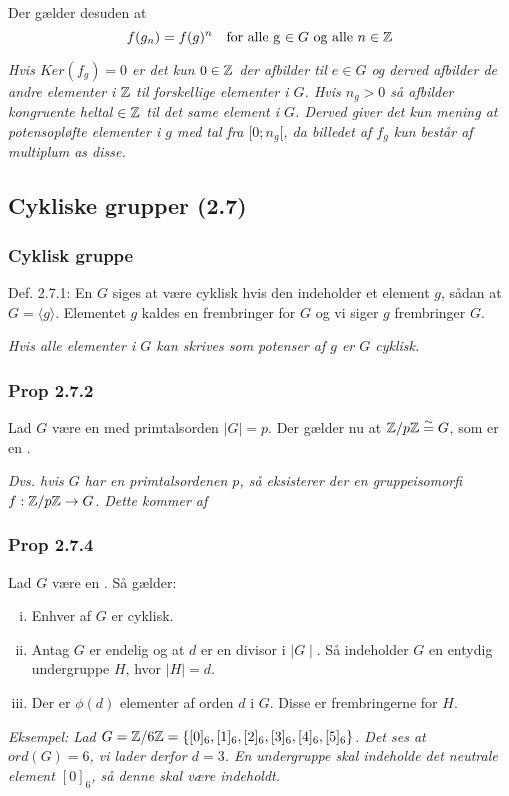 Der gælder desuden at
\begin{equation*}
  f(g_n) = f(g)^n \quad \text{for alle g $\in G$ og alle $n \in \mathbb{Z}$}
\end{equation*}

\textit{Hvis $Ker (f_g) = {0}$ er det kun $0 \in \mathbb{Z}$ der afbilder til $e
\in G$ og derved afbilder de andre elementer i $\mathbb{Z}$ til forskellige elementer i
$G$. Hvis $n_g > 0$ så afbilder kongruente heltal $\in \mathbb{Z}$ til det same element
i $G$. Derved giver det kun mening at potensopløfte elementer i $g$ med tal fra
$[0;n_g[$, da billedet af $f_g$ kun består af multiplum as disse.}

\subsection{Cykliske grupper (2.7)}
\subsubsection{Cyklisk gruppe}
\label{Cyklisk gruppe}
Def. 2.7.1: En  $G$ siges at være cyklisk hvis den indeholder et
element $g$, sådan at $G = \langle g \rangle$. Elementet $g$ kaldes en
frembringer for $G$ og vi siger $g$ frembringer $G$.

\textit{Hvis alle elementer i $G$ kan skrives som potenser af $g$ er $G$
cyklisk.}

\subsubsection{Prop 2.7.2}
Lad $G$ være en  med primtalsorden $\mid G\mid = p$. Der gælder
nu at $\mathbb{Z}/p\mathbb{Z} \overset{\sim}{=} G$, som er en .

\textit{Dvs. hvis $G$ har en primtalsordenen $p$, så eksisterer der en
gruppeisomorfi $f: \mathbb{Z}/p\mathbb{Z} \rightarrow G$. Dette kommer af
}

\subsubsection{Prop 2.7.4}
Lad $G$ være en . Så gælder:
\begin{enumerate}[(i)]
  \item Enhver  af $G$ er cyklisk.
  \item Antag $G$ er endelig og at $d$ er en divisor i $\mid G\mid$. Så
  indeholder $G$ en entydig undergruppe $H$, hvor $\mid H\mid = d$.
  \item Der er $\phi(d)$ elementer af orden $d$ i $G$. Disse er frembringerne
  for $H$.
\end{enumerate}
\textit{Eksempel: Lad $G = \mathbb{Z}/6\mathbb{Z} =
\{ [0]_6,[1]_6,[2]_6,[3]_6,[4]_6,[5]_6 \}$. Det ses at $ord(G) = 6$, vi lader
derfor $d = 3$. En undergruppe skal indeholde det neutrale element $[0]_6$, så
denne skal være indeholdt.}

